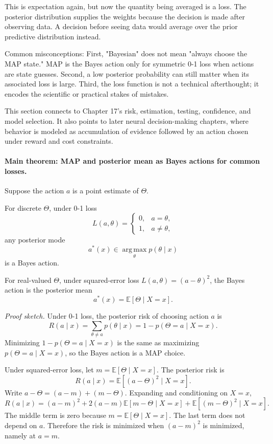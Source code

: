 This is expectation again, but now the quantity being averaged is a loss. The posterior distribution supplies the weights because the decision is made after observing data. A decision before seeing data would average over the prior predictive distribution instead.

Common misconceptions: First, "Bayesian" does not mean "always choose the MAP state." MAP is the Bayes action only for symmetric 0-1 loss when actions are state guesses. Second, a low posterior probability can still matter when its associated loss is large. Third, the loss function is not a technical afterthought; it encodes the scientific or practical stakes of mistakes.

This section connects to Chapter 17's risk, estimation, testing, confidence, and model selection. It also points to later neural decision-making chapters, where behavior is modeled as accumulation of evidence followed by an action chosen under reward and cost constraints.

\paragraph{Main theorem: MAP and posterior mean as Bayes actions for common losses.}
Suppose the action \(a\) is a point estimate of \(\Theta\).

For discrete \(\Theta\), under 0-1 loss
\[
L(a,\theta)=
\begin{cases}
0, & a=\theta,\\
1, & a\neq \theta,
\end{cases}
\]
any posterior mode
\[
a^*(x)\in\operatorname*{arg\,max}_{\theta}p(\theta\mid x)
\]
is a Bayes action.

For real-valued \(\Theta\), under squared-error loss \(L(a,\theta)=(a-\theta)^2\), the Bayes action is the posterior mean
\[
a^*(x)=\mathbb{E}[\Theta\mid X=x].
\]

\emph{Proof sketch.}
Under 0-1 loss, the posterior risk of choosing action \(a\) is
\[
R(a\mid x)
=\sum_{\theta\neq a}p(\theta\mid x)
=1-p(\Theta=a\mid X=x).
\]
Minimizing \(1-p(\Theta=a\mid X=x)\) is the same as maximizing \(p(\Theta=a\mid X=x)\), so the Bayes action is a MAP choice.

Under squared-error loss, let \(m=\mathbb{E}[\Theta\mid X=x]\). The posterior risk is
\[
R(a\mid x)=\mathbb{E}[(a-\Theta)^2\mid X=x].
\]
Write \(a-\Theta=(a-m)+(m-\Theta)\). Expanding and conditioning on \(X=x\),
\[
R(a\mid x)
=(a-m)^2
+2(a-m)\mathbb{E}[m-\Theta\mid X=x]
+\mathbb{E}[(m-\Theta)^2\mid X=x].
\]
The middle term is zero because \(m=\mathbb{E}[\Theta\mid X=x]\). The last term does not depend on \(a\). Therefore the risk is minimized when \((a-m)^2\) is minimized, namely at \(a=m\).

